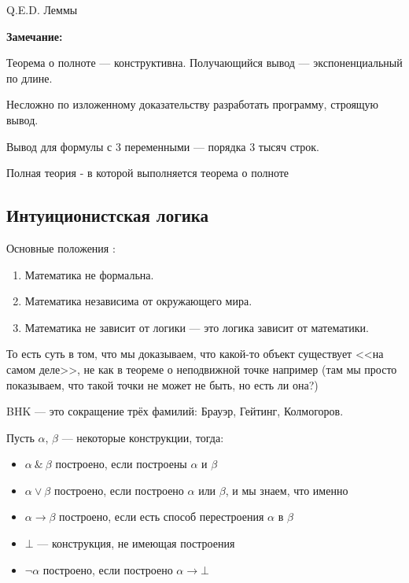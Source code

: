 \hfill Q.E.D. Леммы

\textbf{Замечание:}

Теорема о полноте --- конструктивна. Получающийся вывод --- экспоненциальный по длине.

Несложно по изложенному доказательству разработать программу, строящую вывод.

Вывод для формулы с 3 переменными --- порядка 3 тысяч строк.

 Полная теория - в которой выполняется теорема о полноте


\newpage 

\subsection{Интуиционистская логика}







Основные положения :
\begin{enumerate}
\item Математика не формальна.
\item Математика независима от окружающего мира.
\item Математика не зависит от логики — это логика зависит от математики.
\end{enumerate}

То есть суть в том, что мы доказываем, что какой-то объект существует <<на самом деле>>, не как в теореме о неподвижной точке например (там мы просто показываем, что такой точки не может не быть, но есть ли она?)


BHK — это сокращение трёх фамилий: Брауэр, Гейтинг, Колмогоров.

Пусть $\alpha$, $\beta$ --- некоторые конструкции, тогда:

\begin{itemize}
\item $\alpha\ \&\ \beta$ построено, если построены $\alpha$ и $\beta$
\item $\alpha \vee \beta$ построено, если построено $\alpha$ или $\beta$,
и мы знаем, что именно
\item $\alpha\rightarrow\beta$ построено, если есть способ перестроения
$\alpha$ в $\beta$
\item $\bot$ — конструкция, не имеющая построения
\item $\neg\alpha$ построено, если построено $\alpha\rightarrow\bot$
\end{itemize}

